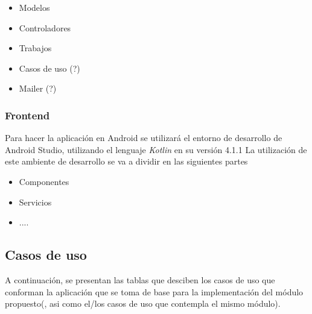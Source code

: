 \begin{itemize}
    \item Modelos
    \item Controladores
    \item Trabajos
    \item Casos de uso (?)
    \item Mailer (?)
\end{itemize}


\subsubsection{Frontend}
Para hacer la aplicación en Android se utilizará el entorno de desarrollo de Android Studio, utilizando el lenguaje \textit{Kotlin} en su versión 4.1.1
\newline\newline
La utilización de este ambiente de desarrollo se va a dividir en las siguientes partes

\begin{itemize}
    \item Componentes
    \item Servicios 
    \item ....
\end{itemize}

\subsection{Casos de uso}
\noindent A continuación, se presentan las tablas que desciben los casos de uso que conforman la aplicación que se toma de base para la implementación del módulo propuesto(, asi como el/los casos de uso que contempla el mismo módulo).

